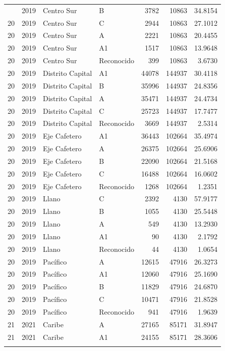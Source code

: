 \begin{longtable}{rrllrrr}
{{20 & 2019 & Centro Sur & B & 3782 & 10863 & 34.8154 \\
20 & 2019 & Centro Sur & C & 2944 & 10863 & 27.1012 \\
20 & 2019 & Centro Sur & A & 2221 & 10863 & 20.4455 \\
20 & 2019 & Centro Sur & A1 & 1517 & 10863 & 13.9648 \\
20 & 2019 & Centro Sur & Reconocido & 399 & 10863 & 3.6730 \\
20 & 2019 & Distrito Capital & A1 & 44078 & 144937 & 30.4118 \\
20 & 2019 & Distrito Capital & B & 35996 & 144937 & 24.8356 \\
20 & 2019 & Distrito Capital & A & 35471 & 144937 & 24.4734 \\
20 & 2019 & Distrito Capital & C & 25723 & 144937 & 17.7477 \\
20 & 2019 & Distrito Capital & Reconocido & 3669 & 144937 & 2.5314 \\
20 & 2019 & Eje Cafetero & A1 & 36443 & 102664 & 35.4974 \\
20 & 2019 & Eje Cafetero & A & 26375 & 102664 & 25.6906 \\
20 & 2019 & Eje Cafetero & B & 22090 & 102664 & 21.5168 \\
20 & 2019 & Eje Cafetero & C & 16488 & 102664 & 16.0602 \\
20 & 2019 & Eje Cafetero & Reconocido & 1268 & 102664 & 1.2351 \\
20 & 2019 & Llano & C & 2392 & 4130 & 57.9177 \\
20 & 2019 & Llano & B & 1055 & 4130 & 25.5448 \\
20 & 2019 & Llano & A & 549 & 4130 & 13.2930 \\
20 & 2019 & Llano & A1 & 90 & 4130 & 2.1792 \\
20 & 2019 & Llano & Reconocido & 44 & 4130 & 1.0654 \\
20 & 2019 & Pacífico & A & 12615 & 47916 & 26.3273 \\
20 & 2019 & Pacífico & A1 & 12060 & 47916 & 25.1690 \\
20 & 2019 & Pacífico & B & 11829 & 47916 & 24.6870 \\
20 & 2019 & Pacífico & C & 10471 & 47916 & 21.8528 \\
20 & 2019 & Pacífico & Reconocido & 941 & 47916 & 1.9639 \\
21 & 2021 & Caribe & A & 27165 & 85171 & 31.8947 \\
21 & 2021 & Caribe & A1 & 24155 & 85171 & 28.3606 \\
}}
\end{longtable}
